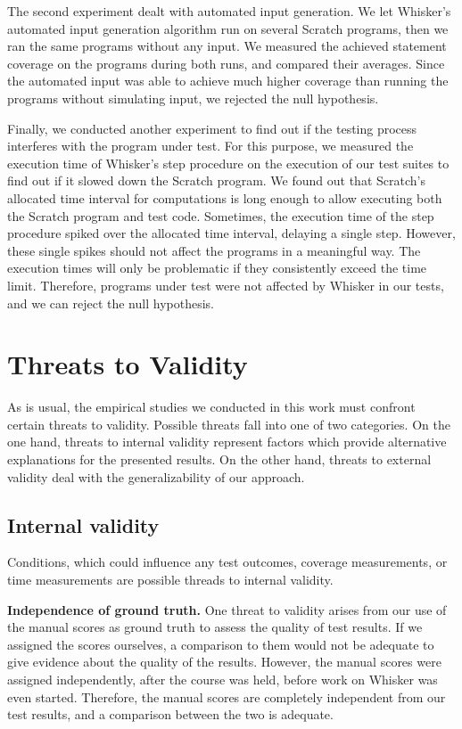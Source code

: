 The second experiment dealt with automated input generation.
We let Whisker's automated input generation algorithm run on several Scratch programs,
then we ran the same programs without any input.
We measured the achieved statement coverage on the programs during both runs,
and compared their averages.
Since the automated input was able to achieve much higher coverage than running the programs without simulating input,
we rejected the null hypothesis.
\parspace

Finally, we conducted another experiment to find out
if the testing process interferes with the program under test.
For this purpose, we measured the execution time of Whisker's step procedure on the execution of our test suites
to find out if it slowed down the Scratch program.
We found out that Scratch's allocated time interval for computations is long enough to
allow executing both the Scratch program and test code.
Sometimes, the execution time of the step procedure spiked over the allocated time interval,
delaying a single step.
However, these single spikes should not affect the programs in a meaningful way.
The execution times will only be problematic if they consistently exceed the time limit.
Therefore, programs under test were not affected by Whisker in our tests, and we can reject the null hypothesis.


\section{Threats to Validity}
\label{sec:threats_to_validity}

As is usual, the empirical studies we conducted in this work must confront certain threats to validity.
Possible threats fall into one of two categories.
On the one hand, threats to internal validity represent factors which provide alternative explanations for the presented results.
On the other hand, threats to external validity deal with the generalizability of our approach.

\subsection{Internal validity}

Conditions, which could influence any test outcomes, coverage measurements,
or time measurements are possible threads to internal validity.
\parspace

\textbf{Independence of ground truth.}
One threat to validity arises from our use of the manual scores as
ground truth to assess the quality of test results.
If we assigned the scores ourselves,
a comparison to them would not be adequate to give evidence about the quality of the results.
However, the manual scores were assigned independently, after the course was held,
before work on Whisker was even started.
Therefore, the manual scores are completely independent from our test results,
and a comparison between the two is adequate.
\parspace

